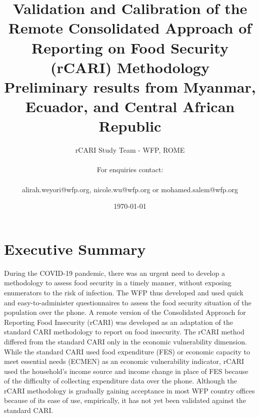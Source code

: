 \documentclass[11pt,harvard]{article}
\author{rCARI Study Team - WFP, ROME \\	\\For enquiries contact:\\		\\alirah.weyori@wfp.org, nicole.wu@wfp.org or mohamed.salem@wfp.org}
\date{\today}
\title{Validation and Calibration of the Remote Consolidated Approach of Reporting on Food Security (rCARI) Methodology 
	\\ {\normalsize Preliminary results from Myanmar, Ecuador, and Central African Republic}}
\begin{document}
	\maketitle \vspace{-1cm}
	\onehalfspacing
	\pagebreak
	\setlength{\parskip}{8pt} %
	
	\tableofcontents
	\pagebreak
	
	
\section*{Executive Summary}

During the COVID-19 pandemic, there was an urgent need to develop a methodology to assess food security in a timely manner, without exposing enumerators to the risk of infection. The WFP thus developed and used quick and easy-to-administer questionnaires to assess the food security situation of the population over the phone. A remote version of the Consolidated Approach for Reporting Food Insecurity (rCARI) was developed as an adaptation of the standard CARI methodology to report on food insecurity. The rCARI method differed from the standard CARI only in the economic vulnerability dimension. While the standard CARI used food expenditure (FES) or economic capacity to meet essential needs (ECMEN) as an economic vulnerability indicator, rCARI used the household’s income source and income change in place of FES because of the difficulty of collecting expenditure data over the phone. Although the rCARI methodology is gradually gaining acceptance in most WFP country offices because of its ease of use, empirically, it has not yet been validated against the standard CARI.
\end{document}
